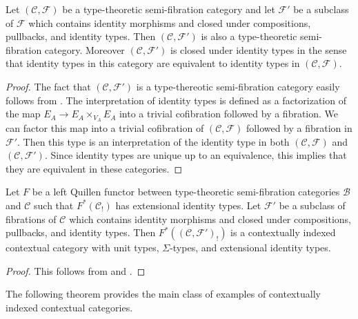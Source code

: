 \documentclass[reqno]{amsart}
\theoremstyle{definition}
\theoremstyle{remark}
\newcommand{\scat}[1]{\mathcal{#1}}
\newcommand{\Fib}{\mathcal{F}}
\numberwithin{figure}{section}
\begin{document}
\begin{prop}
Let $(\scat{C},\Fib)$ be a type-theoretic semi-fibration category and let $\Fib'$ be a subclass of $\Fib$ which contains identity morphisms and closed under compositions, pullbacks, and identity types.
Then $(\scat{C},\Fib')$ is also a type-theoretic semi-fibration category.
Moreover $(\scat{C},\Fib')$ is closed under identity types in the sense that identity types in this category are equivalent to identity types in $(\scat{C},\Fib)$.
\end{prop}
\begin{proof}
The fact that $(\scat{C},\Fib')$ is a type-thereotic semi-fibration category easily follows from .
The interpretation of identity types is defined as a factorization of the map $E_A \to E_A \times_{V_A} E_A$ into a trivial cofibration followed by a fibration.
We can factor this map into a trivial cofibration of $(\scat{C},\Fib)$ followed by a fibration in $\Fib'$.
Then this type is an interpretation of the identity type in both $(\scat{C},\Fib)$ and $(\scat{C},\Fib')$.
Since identity types are unique up to an equivalence, this implies that they are equivalent in these categories.
\end{proof}

\begin{cor}
Let $F$ be a left Quillen functor between type-theoretic semi-fibration categories $\scat{B}$ and $\scat{C}$ such that $F^*(\scat{C}_!)$ has extensional identity types.
Let $\Fib'$ be a subclass of fibrations of $\scat{C}$ which contains identity morphisms and closed under compositions, pullbacks, and identity types.
Then $F^*((\scat{C},\Fib')_!)$ is a contextually indexed contextual category with unit types, $\Sigma$-types, and extensional identity types.
\end{cor}
\begin{proof}
This follows from  and .
\end{proof}

The following theorem provides the main class of examples of contextually indexed contextual categories.
\end{document}
